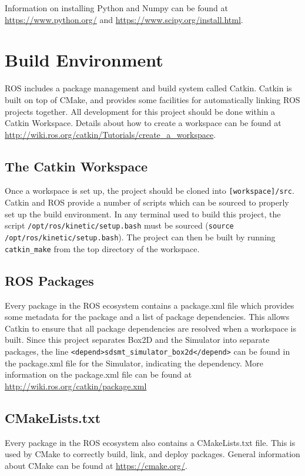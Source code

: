 Information on installing Python and Numpy can be found at \url{https://www.python.org/} and \url{https://www.scipy.org/install.html}.

\section{Build  Environment} \label{sec:buildenv}
ROS includes a package management and build system called Catkin. Catkin is built on top of CMake, and provides some facilities for automatically linking ROS projects together.
All development for this project should be done within a Catkin Workspace. Details about how to create a workspace can be found at \url{http://wiki.ros.org/catkin/Tutorials/create_a_workspace}. 

\subsection{The Catkin Workspace}
Once a workspace is set up, the project should be cloned into \lstinline|[workspace]/src|.
Catkin and ROS provide a number of scripts which can be sourced to properly set up the build environment. In any terminal used to build this project, the script \lstinline|/opt/ros/kinetic/setup.bash| must be sourced (\lstinline|source /opt/ros/kinetic/setup.bash|). The project can then be built by running \lstinline|catkin_make| from the top directory of the workspace.

\subsection{ROS Packages}
Every package in the ROS ecosystem contains a package.xml file which provides some metadata for the package and a list of package dependencies. This allows Catkin to ensure that all package dependencies are resolved when a workspace is built. Since this project separates Box2D and the Simulator into separate packages, the line \lstinline|<depend>sdsmt_simulator_box2d</depend>| can be found in the package.xml file for the Simulator, indicating the dependency.  More information on the package.xml file can be found at \url{http://wiki.ros.org/catkin/package.xml}

\subsection{CMakeLists.txt}
Every package in the ROS ecosystem also contains a CMakeLists.txt file. This is used by CMake to correctly build, link, and deploy packages. General information about CMake can be found at \url{https://cmake.org/}.


